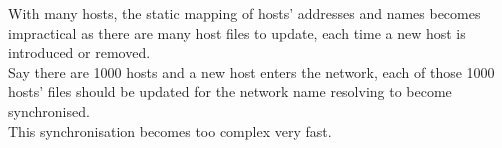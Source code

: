 With many hosts, the static mapping of hosts' addresses and names becomes impractical as there are many host files to update, each time a new host is introduced or removed.\\
Say there are 1000 hosts and a new host enters the network, each of those 1000 hosts' files should be updated for the network name resolving to become synchronised.\\ This synchronisation becomes too complex very fast.
